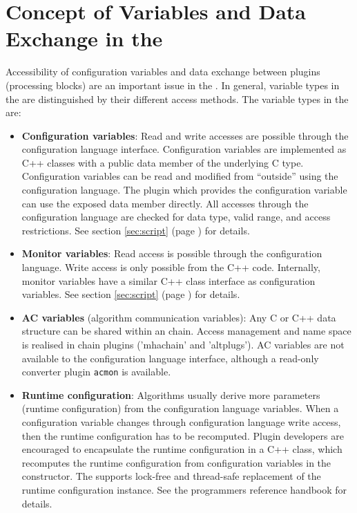 \section{Concept of Variables and Data Exchange in the \mha{}}
\label{sec:variables}

Accessibility of configuration variables and
data exchange between plugins (processing blocks) are an important issue in the
\mha{}. In general, variable types in the \mha{} are distinguished by their
different access methods. The variable types in the \mha{} are:

\begin{itemize}
\item{\bf Configuration variables}: Read and
  write accesses are possible through the \mha{} configuration language interface.
  Configuration variables are implemented as C++ classes with a public data
  member of the underlying C type.
  Configuration variables can be read and modified from ``outside'' using the 
  configuration language.
  The plugin which provides the configuration variable can use 
  the exposed data member directly.
  All accesses through the \mha{} configuration language are checked for data
  type, valid range, and access restrictions. 
  See section \ref{sec:script} (page
  \pageref{sec:script}) for details.
  
\item{\bf Monitor variables}: Read access is possible
  through the \mha{} configuration language. 
  Write access is only possible from the C++ code. 
  Internally, monitor variables have a similar C++ class interface
  as configuration
  variables. See section \ref{sec:script} (page \pageref{sec:script}) for
  details.
  
\item{\bf AC variables} (algorithm
    communication variables): Any C or C++ data structure can be
    shared within an \mha{} chain. Access management and name space is
    realised in \mha{} chain plugins ('mhachain' and
    'altplugs'). 
    AC variables are not available to the \mha{} configuration language interface,
    although a read-only converter plugin \verb!acmon! is available.
  
\item{\bf Runtime configuration}: Algorithms
  usually derive more parameters (runtime configuration)
  from the \mha{} configuration language variables. 
  When a configuration variable changes through configuration language write 
  access, then the runtime configuration has to be recomputed.  
  Plugin developers are encouraged to encapsulate the runtime configuration in 
  a C++ class, which recomputes the runtime configuration from 
  configuration variables in the constructor.
  The \mha{} supports lock-free and thread-safe replacement of the 
  runtime configuration instance.
  See the programmers reference handbook for details.
\end{itemize}

